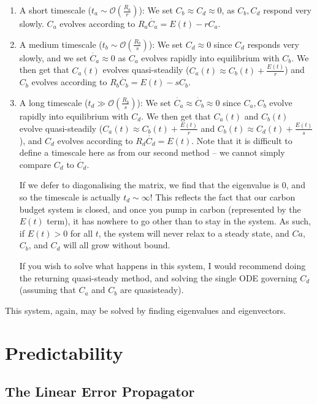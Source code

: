 \begin{enumerate}
    \item A short timescale ($t_a\sim\mathcal{O}\left(\frac{R_a}{r}\right)$):  We set $C_b\approx C_d\approx 0$, as $C_b,C_d$ respond very slowly. $C_a$ evolves according to $R_a \dot{C_a} = E(t)-r C_a$.
    \item A medium timescale ($t_b\sim\mathcal{O}\left(\frac{R_b}{s}\right)$): We set $C_d \approx 0$ since $C_d$ responds very slowly, and we set $\dot{C_a} \approx 0$ as $C_a$ evolves rapidly into equilibrium with $C_b$. We then get that $C_a(t)$ evolves quasi-steadily ($C_a(t)\approx C_b(t)+\frac{E(t)}{r}$) and $C_b$ evolves according to $R_b \dot{C_b}=E(t)-sC_b$.
    \item A long timescale ($t_d\gg\mathcal{O}\left(\frac{R_b}{s}\right)$): We set $\dot{C_a}\approx \dot{C_b} \approx 0$ since $C_a,C_b$ evolve rapidly into equilibrium with $C_d$. We then get that $C_a(t)$ and $C_b(t)$ evolve quasi-steadily ($C_a(t)\approx C_b(t)+\frac{E(t)}{r}$ and $C_b(t)\approx C_d(t) +\frac{E(t)}{s}$), and $C_d$ evolves according to $R_d \dot{C_d}=E(t)$. Note that it is difficult to define a timescale here as from our second method – we cannot simply compare $C_d$ to $\dot{C_d}$. 
    
    If we defer to diagonalising the matrix, we find that the eigenvalue is $0$, and so the timescale is actually $t_d\sim\infty$! This reflects the fact that our carbon budget system is closed, and once you pump in carbon (represented by the $E(t)$ term), it has nowhere to go other than to stay in the system. As such, if $E(t)>0$ for all $t$, the system will never relax to a steady state, and $Ca$, $C_b$, and $C_d$ will all grow without bound.

    If you wish to solve what happens in this system, I would recommend doing the returning quasi-steady method, and solving the single ODE governing $C_d$ (assuming that $C_a$ and $C_b$ are quasisteady). 
\end{enumerate}
This system, again, may be solved by finding eigenvalues and eigenvectors. 

\chapter{Predictability}\label{Predictability}

\section{The Linear Error Propagator}


